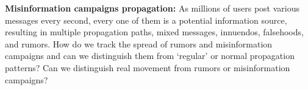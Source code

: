 \noindent
{\bf Misinformation campaigns propagation:} As millions of users post various messages every second, every one of them is a potential information source, resulting in
multiple propagation paths, mixed messages, innuendos, falsehoods, and rumors.
How do we track the spread of rumors and misinformation campaigns and can we distinguish them
from `regular' or normal propagation patterns? Can we distinguish real movement from rumors or misinformation campaigns?\\


